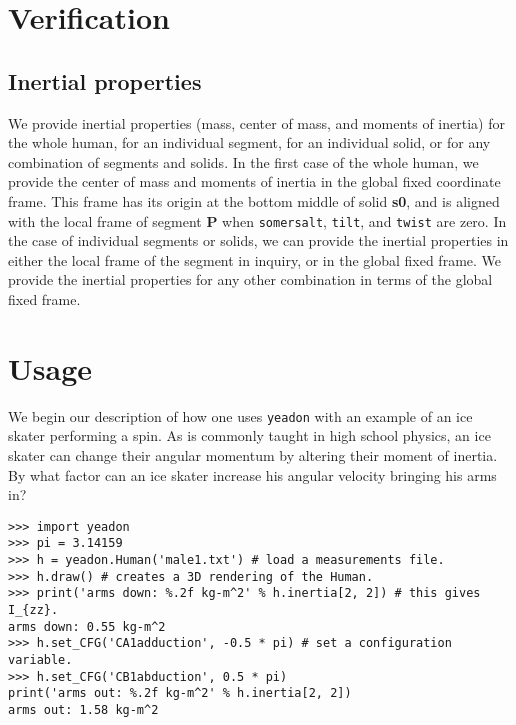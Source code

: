 \documentclass[10pt]{article}
\begin{document}
\section*{Verification}

\subsection*{Inertial properties}

We provide inertial properties (mass, center of mass, and moments of inertia)
for the whole human, for an individual segment, for an individual solid, or for
any combination of segments and solids. In the first case of the whole human,
 we provide the center of mass and moments of inertia in the global fixed coordinate frame. This frame has its
 origin at the bottom middle of solid \textbf{s0}, and is aligned with the
local frame of segment \textbf{P} when \verb+somersalt+, \verb+tilt+, and
\verb+twist+ are zero.
In the case of individual segments or solids, we can provide the inertial
properties in either the local frame of the segment in inquiry, or in the
global fixed frame. We provide the inertial properties for any other
combination in terms of the global fixed frame.





\section*{Usage}
\label{sec:usage}

We begin our description of how one uses \verb+yeadon+ with an example of an
ice skater performing a spin. As is commonly taught in high school physics, an
ice skater can change their angular momentum by altering their moment of
inertia. By what factor can an ice skater increase his angular velocity
bringing his arms in?

\begin{verbatim}
>>> import yeadon
>>> pi = 3.14159
>>> h = yeadon.Human('male1.txt') # load a measurements file.
>>> h.draw() # creates a 3D rendering of the Human.
>>> print('arms down: %.2f kg-m^2' % h.inertia[2, 2]) # this gives I_{zz}.
arms down: 0.55 kg-m^2
>>> h.set_CFG('CA1adduction', -0.5 * pi) # set a configuration variable.
>>> h.set_CFG('CB1abduction', 0.5 * pi)
print('arms out: %.2f kg-m^2' % h.inertia[2, 2])
arms out: 1.58 kg-m^2
\end{verbatim}
\end{document}
